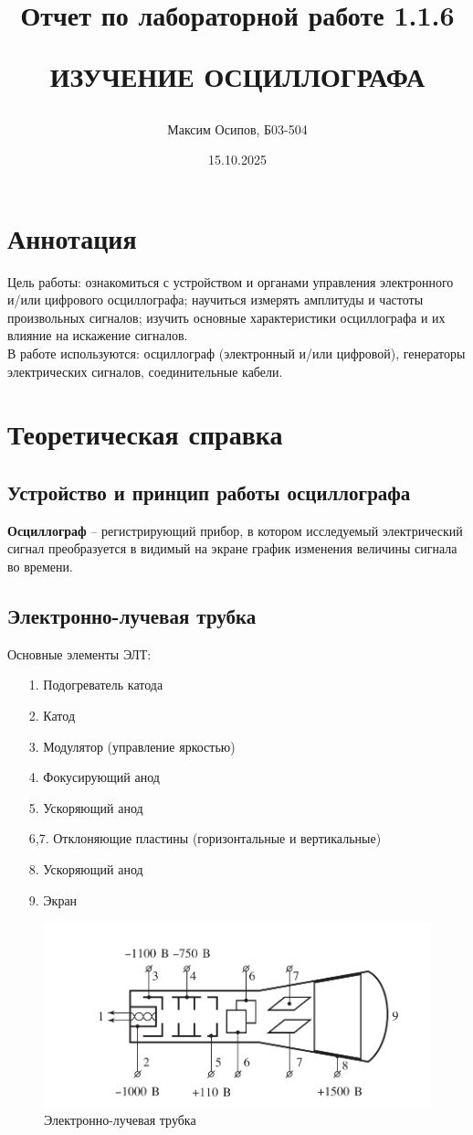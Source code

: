 \documentclass[a4paper, 12pt]{article}
\title{Отчет по лабораторной работе 1.1.6

ИЗУЧЕНИЕ ОСЦИЛЛОГРАФА}
\author{Максим Осипов, Б03-504}
\date{15.10.2025}
\begin{document}
\maketitle
\newpage
\section{Аннотация}
Цель работы: ознакомиться с устройством и органами управления
электронного и/или цифрового осциллографа; научиться измерять амплитуды и частоты произвольных сигналов; изучить основные характеристики осциллографа и их влияние на искажение сигналов.\\

\hspace{0,01cm}В работе используются: осциллограф (электронный и/или цифровой), генераторы электрических сигналов, соединительные кабели.

\section{Теоретическая справка}


\subsection*{Устройство и принцип работы осциллографа}

\textbf{Осциллограф} -- регистрирующий прибор, в котором исследуемый электрический сигнал преобразуется в видимый на экране график изменения величины сигнала во времени.

\subsection*{Электронно-лучевая трубка}

Основные элементы ЭЛТ:
\begin{itemize}
\item[1.] Подогреватель катода
\item[2.] Катод
\item[3.] Модулятор (управление яркостью)
\item[4.] Фокусирующий анод
\item[5.] Ускоряющий анод
\item[6,7.] Отклоняющие пластины (горизонтальные и вертикальные)
\item[8.] Ускоряющий анод
\item[9.] Экран 
\end{itemize}

\begin{figure}[h]
\centering
\includegraphics[width=0.8\linewidth]{рис 1.png}
\caption{Электронно-лучевая трубка}
\label{fig:voltage_current}
\end{figure}
\end{document}
